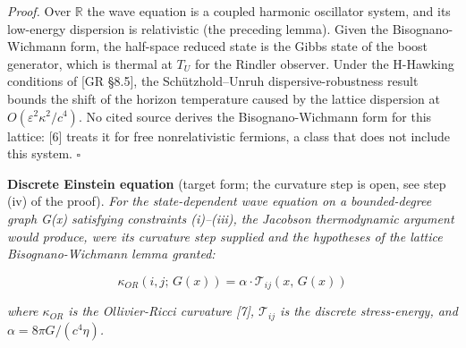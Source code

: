 \documentclass[
]{article}
\begin{document}
\emph{Proof.} Over \(\mathbb{R}\) the wave equation is a coupled
harmonic oscillator system, and its low-energy dispersion is
relativistic (the preceding lemma). Given the Bisognano-Wichmann form,
the half-space reduced state is the Gibbs state of the boost generator,
which is thermal at \(T_U\) for the Rindler observer. Under the
H-Hawking conditions of {[}GR §8.5{]}, the Schützhold--Unruh
dispersive-robustness result bounds the shift of the horizon temperature
caused by the lattice dispersion at \(O(\varepsilon^2\kappa^2/c^4)\). No
cited source derives the Bisognano-Wichmann form for this lattice:
{[}6{]} treats it for free nonrelativistic fermions, a class that does
not include this system. \(\square\)

\textbf{Discrete Einstein equation} (target form; the curvature step is
open, see step (iv) of the proof). \emph{For the state-dependent wave
equation on a bounded-degree graph G(x) satisfying constraints
(i)--(iii), the Jacobson thermodynamic argument would produce, were its
curvature step supplied and the hypotheses of the lattice
Bisognano-Wichmann lemma granted:}

\[\kappa_{OR}(i, j;\, G(x)) = \alpha \cdot \mathcal{T}_{ij}(x,\, G(x))\]

\emph{where \(\kappa_{OR}\) is the Ollivier-Ricci curvature {[}7{]},
\(\mathcal{T}_{ij}\) is the discrete stress-energy, and
\(\alpha = 8\pi G/(c^4 \eta)\).}
\end{document}
